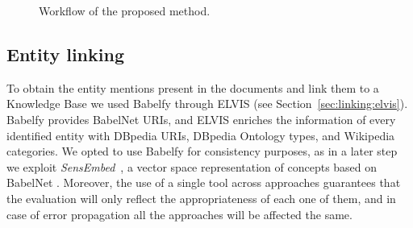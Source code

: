 
\begin{figure}[!htp]
\centerline{}
\caption{Workflow of the proposed method.}
\label{fig:similarity:methodology}
\end{figure}

\subsection{Entity linking}

To obtain the entity mentions present in the documents and link them to a Knowledge Base we used Babelfy \citep{Moroetal2014b} through ELVIS (see Section~\ref{sec:linking:elvis}). Babelfy provides BabelNet URIs, and ELVIS enriches the information of every identified entity with DBpedia URIs, DBpedia Ontology types, and Wikipedia categories.
We opted to use Babelfy for consistency purposes, as in a later step we exploit \textit{SensEmbed}~\citep{Iacobaccietal2015}, a vector space representation of concepts based on BabelNet \citep{Navigli2010}. Moreover, the use of a single tool across approaches guarantees that the evaluation will only reflect the appropriateness of each one of them, and in case of error propagation all the approaches will be affected the same.

%


